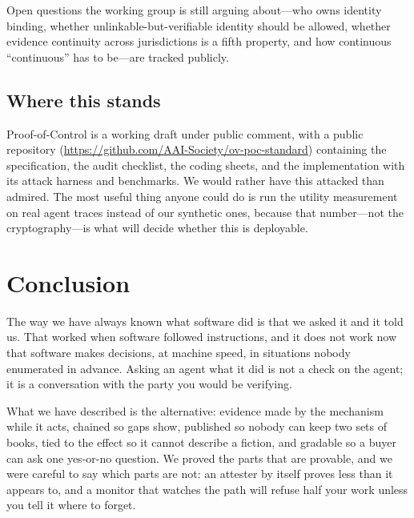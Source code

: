\documentclass[11pt]{article}
\newcommand{\poc}{Proof-of-Control}
\begin{document}
Open questions the working group is still arguing about---who owns identity
binding, whether unlinkable-but-verifiable identity should be allowed, whether
evidence continuity across jurisdictions is a fifth property, and how
continuous ``continuous'' has to be---are tracked publicly.

\subsection{Where this stands}
\poc{} is a working draft under public comment, with a public repository
(\url{https://github.com/AAI-Society/ov-poc-standard}) containing the
specification, the audit checklist, the coding sheets, and the
implementation with its attack harness and benchmarks. We would rather have
this attacked than admired. The most useful thing anyone could do is run the
utility measurement on real agent traces instead of our synthetic ones,
because that number---not the cryptography---is what will decide whether this
is deployable.

\section{Conclusion}

The way we have always known what software did is that we asked it and it told
us. That worked when software followed instructions, and it does not work now
that software makes decisions, at machine speed, in situations nobody
enumerated in advance. Asking an agent what it did is not a check on the
agent; it is a conversation with the party you would be verifying.

What we have described is the alternative: evidence made by the mechanism
while it acts, chained so gaps show, published so nobody can keep two sets of
books, tied to the effect so it cannot describe a fiction, and gradable so a
buyer can ask one yes-or-no question. We proved the parts that are provable,
and we were careful to say which parts are not: an attester by itself proves
less than it appears to, and a monitor that watches the path will refuse half
your work unless you tell it where to forget.
\end{document}
